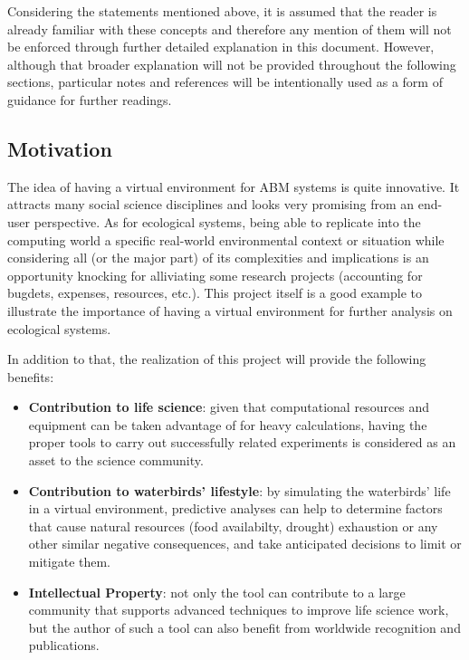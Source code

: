 Considering the statements mentioned above, it is assumed that the reader is already familiar with these concepts and therefore any mention of them will not be enforced through further detailed explanation in this document. However, although that broader explanation will not be provided throughout the following sections, particular notes and references will be intentionally used as a form of guidance for further readings.

\subsection{Motivation}
The idea of having a virtual environment for ABM systems is quite innovative. It attracts many social science disciplines and looks very promising from an end-user perspective. As for ecological systems, being able to replicate into the computing world a specific real-world environmental context or situation while considering all (or the major part) of its complexities and implications is an opportunity knocking for alliviating some research projects (accounting for bugdets, expenses, resources, etc.). This project itself is a good example to illustrate the importance of having a virtual environment for further analysis on ecological systems.

In addition to that, the realization of this project will provide the following benefits:
\begin{itemize}
    \item \textbf{Contribution to life science}: given that computational resources and equipment can be taken advantage of for heavy calculations, having the proper tools to carry out successfully related experiments is considered as an asset to the science community.
    \item \textbf{Contribution to waterbirds' lifestyle}: by simulating the waterbirds' life in a virtual environment, predictive analyses can help to determine factors that cause natural resources (food availabilty, drought) exhaustion or any other similar negative consequences, and take anticipated decisions to limit or mitigate them.
    \item \textbf{Intellectual Property}: not only the tool can contribute to a large community that supports advanced techniques to improve life science work, but the author of such a tool can also benefit from worldwide recognition and publications.
\end{itemize}

